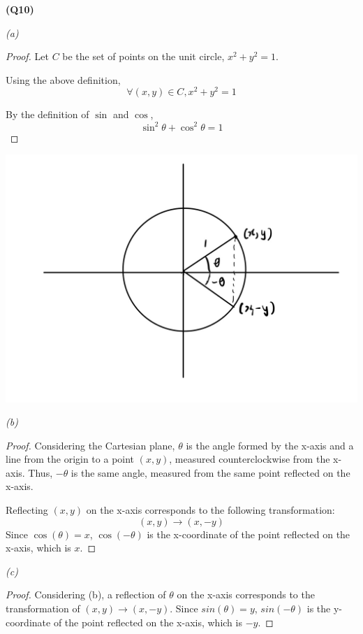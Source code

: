 \documentclass[12pt, letterpaper]{article}
\begin{document}
\textbf{(Q10)}

\textit{(a)}
\begin{proof}
    Let $C$ be the set of points on the unit circle, $x^{2} + y^{2} = 1$.

    Using the above definition,
    \[
        \forall (x,y) \in C, x^2 + y^2 = 1
    \]

    By the definition of $\sin$ and $\cos$,
    \[
        \sin^{2}\theta + \cos^{2}\theta = 1
    \]
\end{proof}

\newpage
\includegraphics[width=\textwidth]{unit_circle.jpg}

\textit{(b)}
\begin{proof}
    Considering the Cartesian plane, $\theta$ is the angle formed by the x-axis and
    a line from the origin to a point $(x,y)$, measured counterclockwise from the x-axis.
    Thus, $-\theta$ is the same angle, measured from the same point reflected on the x-axis.

    Reflecting $(x,y)$ on the x-axis corresponds to the following transformation:
    \[
        (x,y) \rightarrow (x,-y)
    \]
    Since $\cos(\theta) = x$, $\cos(-\theta)$ is the x-coordinate of the point reflected
    on the x-axis, which is $x$.
\end{proof}

\textit{(c)}
\begin{proof}
    Considering (b), a reflection of $\theta$ on the x-axis corresponds to the transformation
    of $(x,y) \rightarrow (x,-y)$.
    Since $sin(\theta) = y$, $sin(-\theta)$ is the y-coordinate of the point reflected
    on the x-axis, which is $-y$.
\end{proof}
\end{document}
